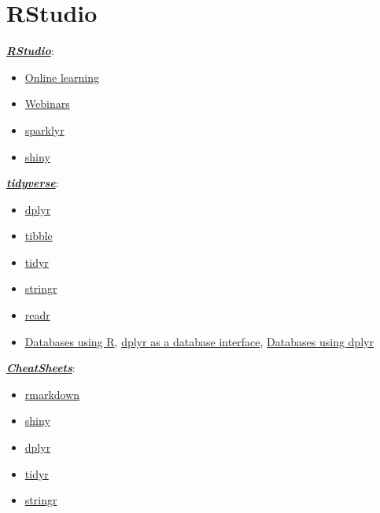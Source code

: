 \documentclass[]{book}
\begin{document}
\hypertarget{rstudio-links}{%
\section{RStudio}\label{rstudio-links}}

\href{https://www.rstudio.com}{\textbf{\emph{RStudio}}}:

\begin{itemize}
\item
  \href{https://www.rstudio.com/online-learning}{Online learning}
\item
  \href{https://resources.rstudio.com/webinars}{Webinars}
\item
  \href{https://spark.rstudio.com/}{sparklyr}
\item
  \href{http://shiny.rstudio.com}{shiny}
\end{itemize}

\href{https://www.tidyverse.org/}{\textbf{\emph{tidyverse}}}:

\begin{itemize}
\item
  \href{https://dplyr.tidyverse.org}{dplyr}
\item
  \href{https://tibble.tidyverse.org}{tibble}
\item
  \href{https://tidyr.tidyverse.org}{tidyr}
\item
  \href{https://stringr.tidyverse.org}{stringr}
\item
  \href{https://readr.tidyverse.org}{readr}
\item
  \href{https://db.rstudio.com}{Databases using R},
  \href{https://db.rstudio.com/overview}{dplyr as a database interface},
  \href{https://db.rstudio.com/dplyr}{Databases using dplyr}
\end{itemize}

\href{https://resources.rstudio.com/rstudio-cheatsheets}{\textbf{\emph{CheatSheets}}}:

\begin{itemize}
\item
  \href{https://resources.rstudio.com/rstudio-cheatsheets/rmarkdown-2-0-cheat-sheet}{rmarkdown}
\item
  \href{https://resources.rstudio.com/rstudio-cheatsheets/shiny-cheat-sheet}{shiny}
\item
  \href{https://github.com/rstudio/cheatsheets/blob/master/data-transformation.pdf}{dplyr}
\item
  \href{https://github.com/rstudio/cheatsheets/blob/master/data-import.pdf}{tidyr}
\item
  \href{https://resources.rstudio.com/rstudio-cheatsheets/stringr-cheat-sheet}{stringr}
\end{itemize}
\end{document}
